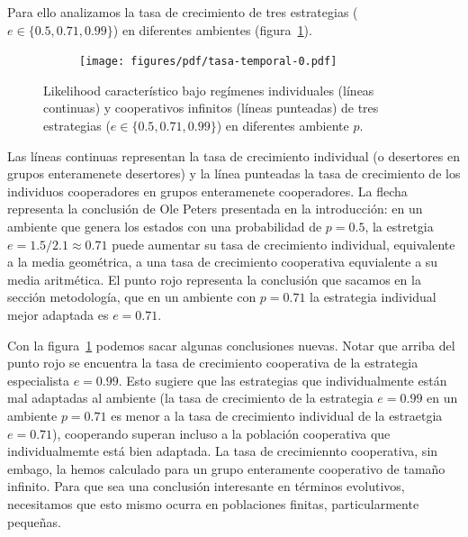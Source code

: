 \documentclass[a4paper,10pt]{article}
\newif\ifen
\newif\ifes
\newcommand{\en}[1]{\ifen#1\fi}
\newcommand{\es}[1]{\ifes#1\fi}
\begin{document}
\en{Here we show that strategies that are individually poorly adapted to the environment (specialists), once cooperation emerges, manage to outperform both individually well-adapted strategies (generalists), as well as their cooperative groups of infinite size. }%
\es{Aquí mostramos que, una vez que la cooperación emerge, las estrategias individualmente mal adaptadas al ambiente (especialistas) consigen superar tanto a las estrategias bien adaptas individualmemte (generalistas), como a sus grupos cooperativos de tamaño infinito. }%
%
Para ello analizamos la tasa de crecimiento de tres estrategias ($e \in \{0.5, 0.71, 0.99\}$) en diferentes ambientes (figura~\ref{fig:tasa-temporal-0}).
%
\begin{figure}[H]
    \centering
    \begin{subfigure}[b]{0.66\textwidth}
    \texttt{[image: figures/pdf/tasa-temporal-0.pdf]}
    \end{subfigure}
    \caption{Likelihood característico bajo regímenes individuales (líneas continuas) y cooperativos infinitos (líneas punteadas) de tres estrategias ($e \in \{0.5, 0.71, 0.99\}$) en diferentes ambiente $p$.}
    \label{fig:tasa-temporal-0}
\end{figure}
%
Las líneas continuas representan la tasa de crecimiento individual (o desertores en grupos enteramenete desertores) y la línea punteadas la tasa de crecimiento de los individuos cooperadores en grupos enteramenete cooperadores. 
%
La flecha representa la conclusión de Ole Peters presentada en la introducción: en un ambiente que genera los estados con una probabilidad de $p = 0.5$, la estretgia $e=1.5/2.1 \approx 0.71 $ puede aumentar su tasa de crecimiento individual, equivalente a la media geométrica, a una tasa de crecimiento cooperativa equvialente a su media aritmética.
%
El punto rojo representa la conclusión que sacamos en la sección metodología, que en un ambiente con $p=0.71$ la estrategia individual mejor adaptada es $e=0.71$.


Con la figura~\ref{fig:tasa-temporal-0} podemos sacar algunas conclusiones nuevas.
%
Notar que arriba del punto rojo se encuentra la tasa de crecimiento cooperativa de la estrategia especialista $e=0.99$.
%
Esto sugiere que las estrategias que individualmente están mal adaptadas al ambiente (la tasa de crecimiento de la estrategia $e=0.99$ en un ambiente $p=0.71$ es menor a la tasa de crecimiento individual de la estraetgia $e=0.71$), cooperando superan incluso a la población cooperativa que individualmemte está bien adaptada.
%
La tasa de crecimiennto cooperativa, sin embago, la hemos calculado para un grupo enteramente cooperativo de tamaño infinito.
%
Para que sea una conclusión interesante en términos evolutivos, necesitamos que esto mismo ocurra en poblaciones finitas, particularmente pequeñas.
\end{document}

